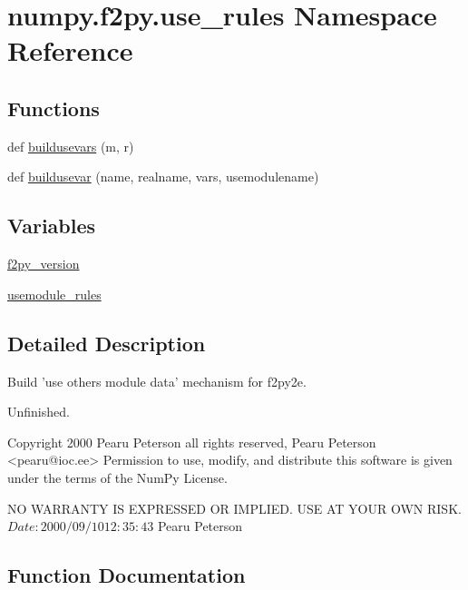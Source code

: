 \hypertarget{namespacenumpy_1_1f2py_1_1use__rules}{}\section{numpy.\+f2py.\+use\+\_\+rules Namespace Reference}
\label{namespacenumpy_1_1f2py_1_1use__rules}
\subsection*{Functions}
\begin{DoxyCompactItemize}
\item 
def \hyperlink{namespacenumpy_1_1f2py_1_1use__rules_af2d676d62b454d2da58a223054be9ec6}{buildusevars} (m, r)
\item 
def \hyperlink{namespacenumpy_1_1f2py_1_1use__rules_a06c0ae5f6d32cbd7e1635f6a12d734c7}{buildusevar} (name, realname, vars, usemodulename)
\end{DoxyCompactItemize}
\subsection*{Variables}
\begin{DoxyCompactItemize}
\item 
\hyperlink{namespacenumpy_1_1f2py_1_1use__rules_aba7818df458703ed3bcf8511883e8af4}{f2py\+\_\+version}
\item 
\hyperlink{namespacenumpy_1_1f2py_1_1use__rules_ad30cab62ddbe5f2c73e91436aa5253ad}{usemodule\+\_\+rules}
\end{DoxyCompactItemize}


\subsection{Detailed Description}
\begin{DoxyVerb}Build 'use others module data' mechanism for f2py2e.

Unfinished.

Copyright 2000 Pearu Peterson all rights reserved,
Pearu Peterson <pearu@ioc.ee>
Permission to use, modify, and distribute this software is given under the
terms of the NumPy License.

NO WARRANTY IS EXPRESSED OR IMPLIED.  USE AT YOUR OWN RISK.
$Date: 2000/09/10 12:35:43 $
Pearu Peterson\end{DoxyVerb}
 

\subsection{Function Documentation}
\mbox{\label{namespacenumpy_1_1f2py_1_1use__rules_a06c0ae5f6d32cbd7e1635f6a12d734c7}} 

